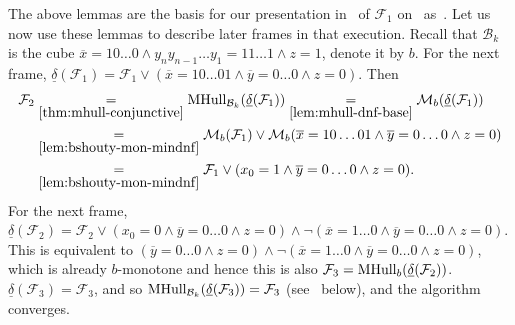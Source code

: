 \documentclass[acmsmall,screen]{acmart}
\newcommand{\ov}{\overline}
\newcommand{\tr}{\delta}
\newcommand{\Frame}{\mathcal{F}}
\renewcommand{\vec}{\ov}
\newcommand{\reflextr}[1]{\underline{#1}}
\newcommand{\postimage}[2]{{\reflextr{#1}}({#2})}
\newcommand{\bkwrch}[1]{\mathcal{B}_{#1}}
\newcommand{\monox}[2]{\mathcal{M}_{#2}({#1})}
\newcommand{\mhull}[2]{{\rm MHull}_{#2}({#1})}
\newcommand{\bkcube}{b}
\begin{document}
\begin{example}
\label{ex:running-all-frames}
The above lemmas are the basis for our presentation in~ of $\Frame_1$ on~ as~.
Let us now use these lemmas to describe later frames in that execution.
%
Recall that $\bkwrch{k}$ is the cube $\vec{x} = 10\ldots0 \land y_n y_{n-1} \ldots y_1 = 11\ldots1 \land z=1$, denote it by $b$.
%
For the next frame,
$\postimage{\tr}{\Frame_1}=\Frame_1 \lor (\vec{x}=10\ldots01 \land \vec{y}=0\ldots0 \land z=0)$. Then
\begin{align*}
		\Frame_2
	&\underset{\rm \Cref{thm:mhull-conjunctive}}{=}
		\mhull{\postimage{\tr}{\Frame_1}}{\bkwrch{k}}
	\underset{\rm \Cref{lem:mhull-dnf-base}}{=}
		\monox{\postimage{\tr}{\Frame_1}}{\bkcube}
	\\
	&\underset{\rm \Cref{lem:bshouty-mon-mindnf}}{=}
		\monox{\Frame_1}{\bkcube} \lor
		\monox{\vec{x}=10\ldots01 \land \vec{y}=0\ldots0 \land z=0}{\bkcube}
	\\
	&\underset{\rm \Cref{lem:bshouty-mon-mindnf}}{=}
		\Frame_1 \lor (x_0=1 \land \vec{y}=0\ldots0 \land z=0).
\end{align*}
%
For the next frame, $\postimage{\tr}{\Frame_2} = \Frame_2 \lor (x_0=0 \land \vec{y}=0\ldots0 \land z=0) \land \neg(\vec{x}=1\ldots0 \land \vec{y}=0\ldots0 \land z=0)$. This is equivalent to $(\vec{y}=0\ldots0 \land z=0) \land \neg(\vec{x}=1\ldots0 \land \vec{y}=0\ldots0 \land z=0)$, which is already $\bkcube$-monotone and hence this is also $\Frame_3 = \mhull{\postimage{\tr}{\Frame_2}}{\bkcube}$.
$\postimage{\tr}{\Frame_3}=\Frame_3$, and so $\mhull{\postimage{\tr}{\Frame_3}}{\bkwrch{k}} = \Frame_3$ (see~ below), and the algorithm converges.
\end{example}
%
\end{document}
